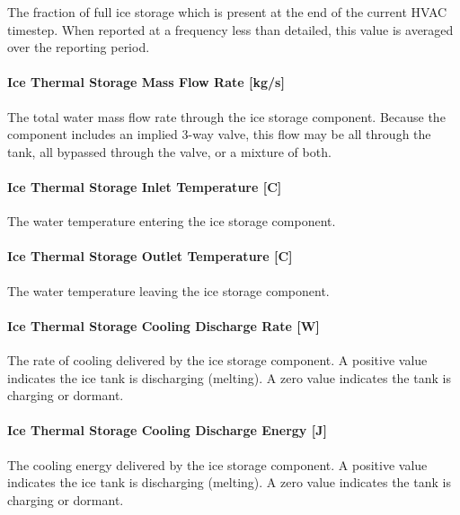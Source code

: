 The fraction of full ice storage which is present at the end of the current HVAC timestep. When reported at a frequency less than detailed, this value is averaged over the reporting period.

\paragraph{Ice Thermal Storage Mass Flow Rate {[}kg/s{]}}\label{ice-thermal-storage-mass-flow-rate-kgs}

The total water mass flow rate through the ice storage component. Because the component includes an implied 3-way valve, this flow may be all through the tank, all bypassed through the valve, or a mixture of both.

\paragraph{Ice Thermal Storage Inlet Temperature {[}C{]}}\label{ice-thermal-storage-inlet-temperature-c}

The water temperature entering the ice storage component.

\paragraph{Ice Thermal Storage Outlet Temperature {[}C{]}}\label{ice-thermal-storage-outlet-temperature-c}

The water temperature leaving the ice storage component.

\paragraph{Ice Thermal Storage Cooling Discharge Rate {[}W{]}}\label{ice-thermal-storage-cooling-discharge-rate-w}

The rate of cooling delivered by the ice storage component. A positive value indicates the ice tank is discharging (melting). A zero value indicates the tank is charging or dormant.

\paragraph{Ice Thermal Storage Cooling Discharge Energy {[}J{]}}\label{ice-thermal-storage-cooling-discharge-energy-j}

The cooling energy delivered by the ice storage component. A positive value indicates the ice tank is discharging (melting). A zero value indicates the tank is charging or dormant.

